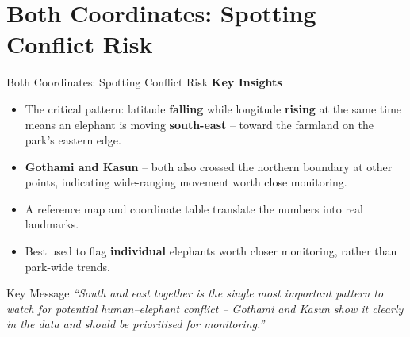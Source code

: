 \documentclass{beamer}
\begin{document}
	
	
	\section{Both Coordinates: Spotting Conflict Risk}
	\begin{frame}{Both Coordinates: Spotting Conflict Risk}
		\textbf{Key Insights}
		\small
		\begin{itemize}
			
			\item The critical pattern: latitude \textbf{falling} while longitude \textbf{rising} at the same time means an elephant is moving \textbf{south-east} -- toward the farmland on the park's eastern edge.
			\item \textbf{Gothami and Kasun} -- both also crossed the northern boundary at other points, indicating wide-ranging movement worth close monitoring.
			
			\item A reference map and coordinate table translate the numbers into real landmarks.
			\item Best used to flag \textbf{individual} elephants worth closer monitoring, rather than park-wide trends.
		\end{itemize}
		
		\vspace{0.4cm}
		\begin{block}{Key Message}
			\textit{``South and east together is the single most important pattern to watch for potential human--elephant conflict -- Gothami and Kasun show it clearly in the data and should be prioritised for monitoring.''}
		\end{block}
	\end{frame}
	
	
	
	
	
\end{document}
